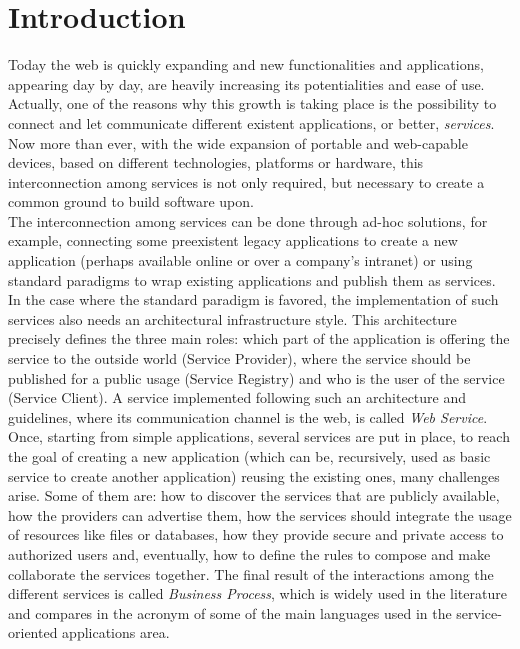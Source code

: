 \section{Introduction}

Today the web is quickly expanding and new functionalities and applications, appearing day by day, are heavily increasing its potentialities and ease of use. Actually, one of the reasons why this growth is taking place is the possibility to connect and let communicate different existent applications, or better, \textit{services}. Now more than ever, with the wide expansion of portable and web-capable devices, based on different technologies, platforms or hardware, this interconnection among services is not only required, but necessary to create a common ground to build software upon.\\

The interconnection among services can be done through ad-hoc solutions, for example, connecting some preexistent legacy applications to create a new application (perhaps available online or over a company's intranet) or using standard paradigms to wrap existing applications and publish them as services. %
In the case where the standard paradigm is favored, the implementation of such services also needs an architectural infrastructure style. This architecture precisely defines the three main roles: which part of the application is offering the service to the outside world (Service Provider), where the service should be published for a public usage (Service Registry) and who is the user of the service (Service Client). %
A service implemented following such an architecture and guidelines, where its communication channel is the web, is called \textit{Web Service}.\\ %

Once, starting from simple applications, several services are put in place, to reach the goal of creating a new application (which can be, recursively, used as basic service to create another application) reusing the existing ones, many challenges arise. Some of them are: how to discover the services that are publicly available, how the providers can advertise them, how the services should integrate the usage of resources like files or databases, how they provide secure and private access to authorized users and, eventually, how to define the rules to compose and make collaborate the services together. 
The final result of the interactions among the different services is called \textit{Business Process}, which is widely used in the literature and compares in the acronym of some of the main languages used in the service-oriented applications area.\\

